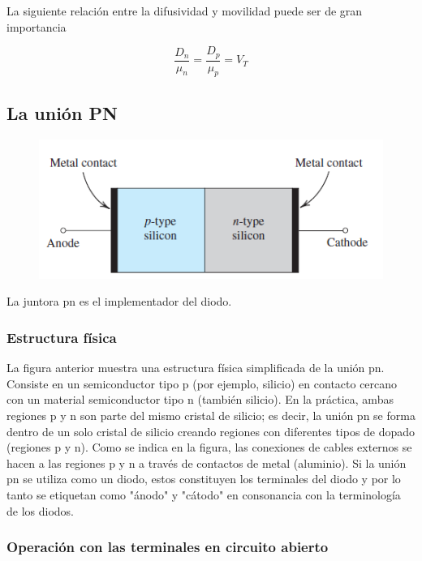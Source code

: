 La siguiente relación entre la difusividad y movilidad puede ser de gran importancia

\begin{equation*}
\frac{D_n}{\mu_n} = \frac{D_p}{\mu_p} = V_T
\end{equation*}

\subsection{La unión PN} \label{subSeccionUnionPN}

\begin{figure}[H]
    \centering
    \includegraphics[scale=0.6]{Electronica/pn_f1.png}
\end{figure}

La juntora pn es el implementador del diodo.

\subsubsection{Estructura física}

La figura anterior muestra una estructura física simplificada de la unión pn. Consiste en un semiconductor tipo p (por ejemplo, silicio) en contacto cercano con un material semiconductor tipo n (también silicio). En la práctica, ambas regiones p y n son parte del mismo cristal de silicio; es decir, la unión pn se forma dentro de un solo cristal de silicio creando regiones con diferentes tipos de dopado (regiones p y n). Como se indica en la figura, las conexiones de cables externos se hacen a las regiones p y n a través de contactos de metal (aluminio). Si la unión pn se utiliza como un diodo, estos constituyen los terminales del diodo y por lo tanto se etiquetan como "ánodo" y "cátodo" en consonancia con la terminología de los diodos.

\subsubsection{Operación con las terminales en circuito abierto}


